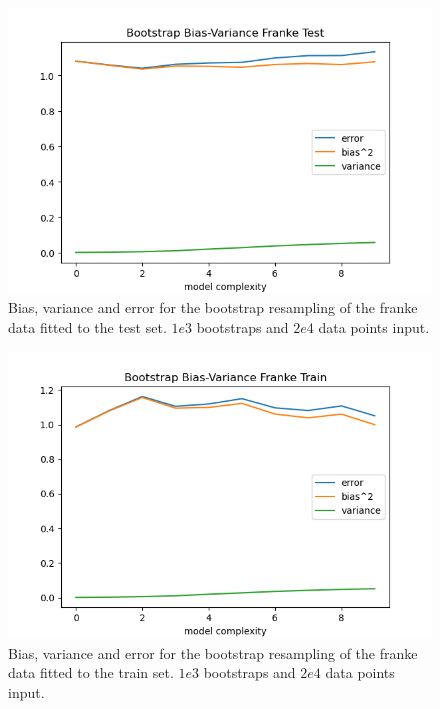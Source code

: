 \documentclass[15pt comic sans]{revtex4-2}
\begin{document}
\begin{figure}[hbtp]
\includegraphics[scale=0.7]{
	../plots/frankeBootstrapBiasVariancesigma1poly10boot1e3datapt2e4test.png}
\caption{
	Bias, variance and error for the bootstrap resampling of the franke data fitted to 
	the test set. $1e3$ bootstraps and $2e4$ data points input. 
	}
\label{fig:BootstrapBiasVariance2e4test}
\end{figure}

\begin{figure}[hbtp]
\includegraphics[scale=0.7]{
	../plots/frankeBootstrapBiasVariancesigma1poly10boot1e3datapt2e4train.png}
\caption{
	Bias, variance and error for the bootstrap resampling of the franke data fitted to 
	the train set. $1e3$ bootstraps and $2e4$ data points input. 
	}
\label{fig:BootstrapBiasVariance2e4train}
\end{figure}
\end{document}
